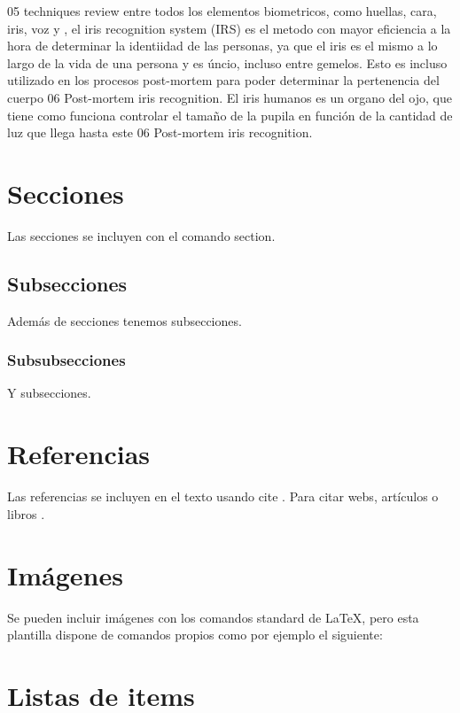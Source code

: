 
05 techniques review entre todos los elementos biometricos, como huellas, cara, iris, voz y , el iris recognition system (IRS) es el metodo con mayor eficiencia a la hora de determinar la identiidad
de las personas, ya que el iris es el mismo a lo largo de la vida de una persona y es úncio, incluso entre gemelos. Esto es incluso utilizado en los procesos 
post-mortem para poder determinar la pertenencia del cuerpo 06 Post-mortem iris recognition. El iris humanos es un organo del ojo, que tiene como funciona controlar el tamaño
de la pupila en función de la cantidad de luz que llega hasta este 06 Post-mortem iris recognition.

\section{Secciones}

Las secciones se incluyen con el comando section.

\subsection{Subsecciones}

Además de secciones tenemos subsecciones.

\subsubsection{Subsubsecciones}

Y subsecciones. 


\section{Referencias}

Las referencias se incluyen en el texto usando cite \cite{wiki:latex}. Para citar webs, artículos o libros \cite{koza92}.


\section{Imágenes}

Se pueden incluir imágenes con los comandos standard de \LaTeX, pero esta plantilla dispone de comandos propios como por ejemplo el siguiente:


\section{Listas de items}

